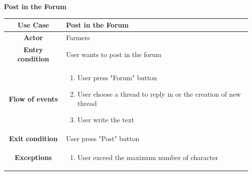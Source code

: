 \documentclass[table, 12pt]{article}
\begin{document}
\begin{itemize}
            \begin{table}[H]
                \item[] \textbf{Post in the Forum}
                \item[] 
                \centering
                \begin{tabular}{|c| m{}|}
                    \hline
                    \textbf{Use Case} & Post in the Forum\\ \hline
                    \textbf{Actor} & Farmers\\ \hline
                    \textbf{Entry condition} & User wants to post in the forum\\  \hline
                    \textbf{Flow of events} & \begin{enumerate}
                                                \item User press "Forum" button
                                                \item User choose a thread to reply in or the creation of new thread
                                                \item User write the text
                                            \end{enumerate}\\ \hline
                    \textbf{Exit condition} & User press "Post" button\\ \hline
                    \textbf{Exceptions} &  \begin{enumerate}
                        \item User exceed the maximum number of character 
                    \end{enumerate}\\ \hline                    
                \end{tabular}
            \end{table}


\end{itemize}
\end{document}

